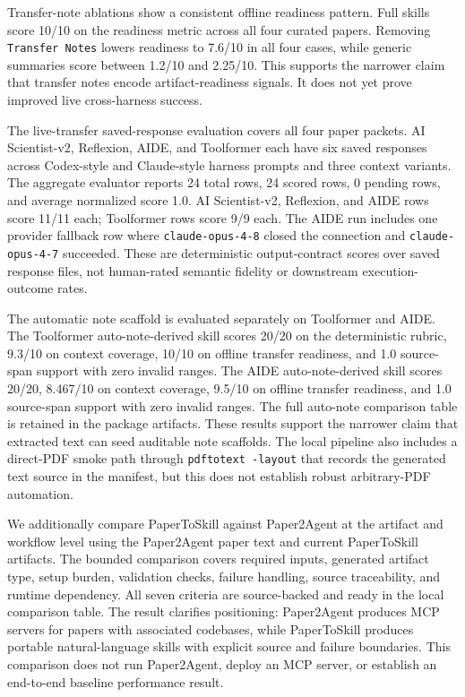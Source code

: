 \documentclass[letterpaper]{article}
\begin{document}
Transfer-note ablations show a consistent offline readiness pattern. Full
skills score 10/10 on the readiness metric across all four curated papers.
Removing \texttt{Transfer Notes} lowers readiness to 7.6/10 in all four cases,
while generic summaries score between 1.2/10 and 2.25/10. This supports the
narrower claim that transfer notes encode artifact-readiness signals. It does
not yet prove improved live cross-harness success.

The live-transfer saved-response evaluation covers all four paper packets.
AI Scientist-v2, Reflexion, AIDE, and Toolformer each have six saved responses
across Codex-style and Claude-style harness prompts and three context variants.
The aggregate evaluator reports 24 total rows, 24 scored rows, 0 pending rows,
and average normalized score 1.0. AI Scientist-v2, Reflexion, and AIDE rows
score 11/11 each; Toolformer rows score 9/9 each. The AIDE run includes one
provider fallback row where \texttt{claude-opus-4-8} closed the connection and
\texttt{claude-opus-4-7} succeeded. These are deterministic output-contract
scores over saved response files, not human-rated semantic fidelity or
downstream execution-outcome rates.

The automatic note scaffold is evaluated separately on Toolformer and AIDE. The
Toolformer auto-note-derived skill scores 20/20 on the deterministic rubric,
9.3/10 on context coverage, 10/10 on offline transfer readiness, and 1.0
source-span support with zero invalid ranges. The AIDE auto-note-derived skill
scores 20/20, 8.467/10 on context coverage, 9.5/10 on offline transfer
readiness, and 1.0 source-span support with zero invalid ranges. The full
auto-note comparison table is retained in the package artifacts. These results
support the narrower claim that extracted text can seed auditable note
scaffolds. The local pipeline also
includes a direct-PDF smoke path through \texttt{pdftotext -layout} that records
the generated text source in the manifest, but this does not establish robust
arbitrary-PDF automation.

We additionally compare PaperToSkill against Paper2Agent at the artifact and
workflow level using the Paper2Agent paper text and current PaperToSkill
artifacts. The bounded comparison covers required inputs, generated artifact
type, setup burden, validation checks, failure handling, source traceability,
and runtime dependency. All seven criteria are source-backed and ready in the
local comparison table. The result clarifies positioning: Paper2Agent produces
MCP servers for papers with associated codebases, while PaperToSkill produces
portable natural-language skills with explicit source and failure boundaries.
This comparison does not run Paper2Agent, deploy an MCP server, or establish an
end-to-end baseline performance result.
\end{document}

